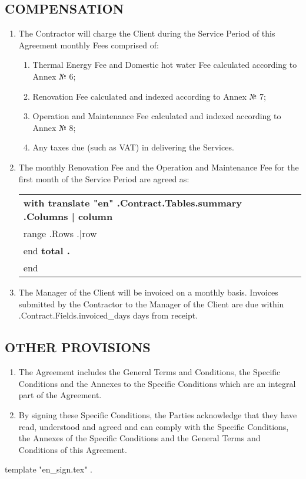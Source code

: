 \subsection{COMPENSATION}
\begin{enumerate}
	\item	The Contractor will charge the Client during the Service Period of this Agreement monthly Fees comprised of:
	\begin{enumerate}
		\item	Thermal Energy Fee and Domestic hot water Fee calculated according to Annex № 6;
		\item	Renovation Fee calculated and indexed according to Annex № 7;
		\item	Operation and Maintenance Fee calculated and indexed according to Annex № 8;
		\item	Any taxes due (such as VAT) in delivering the Services.

	\end{enumerate}
	\item	The monthly Renovation Fee and the Operation and Maintenance Fee for the first month of the Service Period are agreed as:
\begin{center}
	\begin{tabu}{|X|X|X|X|}\tabucline{}\rowfont[c]\bfseries
	{{with translate "en" .Contract.Tables.summary}} %
	{{.Columns | column}} \\\tabucline{}
	{{range .Rows}} %
	{{.|row}} \\\tabucline{}
	{{end}}
	\bfseries {{total .}} \\\tabucline{} %
	{{end}}
	\end{tabu}
\end{center}


	\item	The Manager of the Client will be invoiced on a monthly basis. Invoices submitted by the Contractor to the Manager of the Client are due within \iffalse input fields.invoiced_days value="{{.Contract.Fields.invoiced_days}}" type="number" \fi {{.Contract.Fields.invoiced_days}} days from receipt.
\end{enumerate}

\subsection{OTHER PROVISIONS}
\begin{enumerate}
	\item	The Agreement includes the General Terms and Conditions, the Specific Conditions and the Annexes to the Specific Conditions which are an integral part of the Agreement.
	\item	By signing these Specific Conditions, the Parties acknowledge that they have read, understood and agreed and can comply with the Specific Conditions, the Annexes of the Specific Conditions and the General Terms and Conditions of this Agreement.
\end{enumerate}
{{template "en_sign.tex" .}} %

